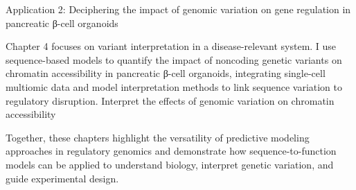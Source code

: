 \begin{dissertationintroduction}
    Application 2: Deciphering the impact of genomic variation on gene regulation in pancreatic β-cell organoids

    Chapter 4 focuses on variant interpretation in a disease-relevant system. I use sequence-based models to quantify the impact of noncoding genetic variants on chromatin accessibility in pancreatic β-cell organoids, integrating single-cell multiomic data and model interpretation methods to link sequence variation to regulatory disruption. Interpret the effects of genomic variation on chromatin accessibility

    Together, these chapters highlight the versatility of predictive modeling approaches in regulatory genomics and demonstrate how sequence-to-function models can be applied to understand biology, interpret genetic variation, and guide experimental design.

\end{dissertationintroduction}
